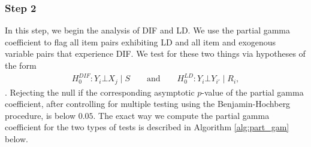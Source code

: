 \documentclass[a4project,12pt]{article}
\theoremstyle{examplestyle}
\theoremstyle{defstyle}
\theoremstyle{thmstyle}
\begin{document}
\subsubsection{Step 2}
In this step, we begin the analysis of DIF and LD. We use the partial gamma coefficient to flag all item pairs exhibiting LD and all item and exogenous variable pairs that experience DIF. We test for these two things via hypotheses of the form
\begin{align*}
    H_0^{DIF}: Y_i \bot X_j  \mid S \qquad \text{and} \qquad H_0^{LD}:Y_i \bot Y_{i'} \mid R_i,
\end{align*}
\cite{Kreiner_Christensen_2011}. Rejecting the null if the corresponding asymptotic $p$-value of the partial gamma coefficient, after controlling for multiple testing using the Benjamin-Hochberg procedure, is below $0.05$. The exact way we compute the partial gamma coefficient for the two types of tests is described in Algorithm \ref{alg:part_gam} below. 
\end{document}
